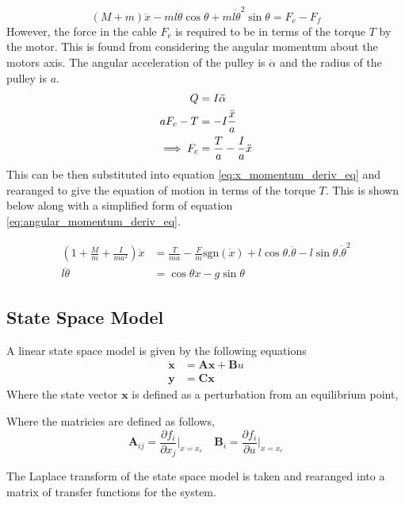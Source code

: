 \documentclass{article}
\begin{document}
\begin{equation}
  (M+m)\ddot{x} - ml\ddot{\theta}\cos\theta + ml\dot{\theta}^2\sin\theta = F_c - F_f
  \label{eq:x_momentum_deriv_eq}
\end{equation}
However, the force in the cable $F_c$ is required to be in terms of the torque $T$ by the motor.
This is found from considering the angular momentum about the motors axis. The angular acceleration of the pulley is $\ddot{\alpha}$ and the radius of the pulley is $a$.
\begin{align}
  Q &= I\ddot{\alpha} \notag \\
  aF_c - T &= -I\frac{\ddot{x}}{a} \notag \\
  \implies F_c &= \frac{T}{a} - \frac{I}{a}\ddot{x}
\end{align}
This can be then substituted into equation \ref{eq:x_momentum_deriv_eq} and rearanged to give the equation of motion in terms of the torque $T$.
This is shown below along with a simplified form of equation \ref{eq:angular_momentum_deriv_eq}.

\begin{align}
  \left( 1 + \frac{M}{m} + \frac{I}{ma^2} \right) \ddot{x} &= \frac{T}{ma} - \frac{F}{m}\text{sgn}(\dot{x}) + l\cos\theta . \ddot{\theta} - l\sin\theta . \dot{\theta}^2 \label{eq:motion_1} \\
  l \ddot{\theta} &= \cos\theta \ddot{x} - g\sin\theta \label{eq:motion_2}
\end{align}

\subsection{State Space Model}

A linear state space model is given by the following equations
\begin{align}
  \mathbf{\dot{x}} &= \mathbf{Ax} + \mathbf{B}u \\
  \mathbf{y} &= \mathbf{Cx}
\end{align}
Where the state vector $\mathbf{x}$ is defined as a perturbation from an equilibrium point,

Where the matricies are defined as follows,
\begin{equation}
  \mathbf{A}_{ij} = \frac{\partial f_i}{\partial x_j} \Bigr|_{x=x_e} \quad \mathbf{B}_{i} = \frac{\partial f_i}{\partial u} \Bigr|_{x=x_e}
\end{equation}

The Laplace transform of the state space model is taken and rearanged into a matrix of transfer functions for the system.
\end{document}
